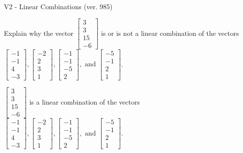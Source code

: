 \begin{exercise}
  \begin{exerciseTitle}V2 - Linear Combinations (ver. 985)\end{exerciseTitle}
  \begin{exerciseStatement}
    Explain why the vector \(\left[\begin{array}{c}
3 \\
3 \\
15 \\
-6
\end{array}\right]\)  is or is not a linear 
	combination of the vectors \(\left[\begin{array}{c}
-1 \\
-1 \\
4 \\
-3
\end{array}\right] , \left[\begin{array}{c}
-2 \\
2 \\
3 \\
1
\end{array}\right] , \left[\begin{array}{c}
-1 \\
-1 \\
-5 \\
2
\end{array}\right] , \text{ and } \left[\begin{array}{c}
-5 \\
-1 \\
2 \\
1
\end{array}\right]\).
	


  \end{exerciseStatement}
  \begin{exerciseAnswer}
   \(\left[\begin{array}{c}
3 \\
3 \\
15 \\
-6
\end{array}\right]\) 
  	 is  
	a linear combination of the vectors \(\left[\begin{array}{c}
-1 \\
-1 \\
4 \\
-3
\end{array}\right] , \left[\begin{array}{c}
-2 \\
2 \\
3 \\
1
\end{array}\right] , \left[\begin{array}{c}
-1 \\
-1 \\
-5 \\
2
\end{array}\right] , \text{ and } \left[\begin{array}{c}
-5 \\
-1 \\
2 \\
1
\end{array}\right]\).


\end{exerciseAnswer}
\end{exercise}
